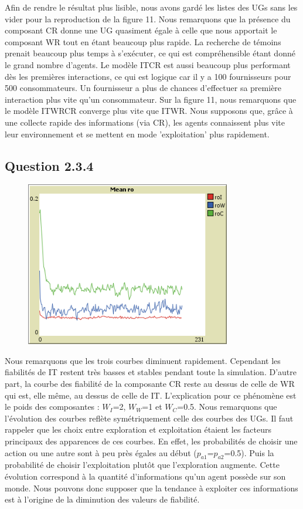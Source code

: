 Afin de rendre le résultat plus lisible, nous avons gardé les listes des UGs sans les vider pour la reproduction de la figure 11.
Nous remarquons que la présence du composant CR donne une UG quasiment égale à celle que nous apportait le composant WR tout en étant beaucoup plus rapide. La recherche de témoins prenait beaucoup plus temps à s'exécuter, ce qui est compréhensible étant donné le grand nombre d'agents. Le modèle ITCR est aussi beaucoup plus performant dès les premières interactions, ce qui est logique car il y a 100 fournisseurs pour 500 consommateurs. Un fournisseur a plus de chances d'effectuer sa première interaction plus vite qu'un consommateur.
Sur la figure 11, nous remarquons que le modèle ITWRCR converge plus vite que ITWR. Nous supposons que, grâce à une collecte rapide des informations (via CR), les agents connaissent plus vite leur environnement et se mettent en mode 'exploitation' plus rapidement.

\subsection{Question 2.3.4}
\begin{figure}[H]
\centering
\captionsetup{justification=centering}
\includegraphics[width=0.8\textwidth]{images/ROs.png}
\label{fig:ROs}
\end{figure}
Nous remarquons que les trois courbes diminuent rapidement. Cependant les fiabilités de IT restent très basses et stables pendant toute la simulation.
D'autre part, la courbe des fiabilité de la composante CR reste au dessus de celle de WR qui est, elle même, au dessus de celle de IT. L'explication pour ce phénomène est le poids des composantes : $W_I$=2, $W_W$=1 et $W_C$=0.5.
Nous remarquons que l'évolution des courbes reflète symétriquement celle des courbes des UGs. Il faut rappeler que les choix entre exploration et exploitation étaient les facteurs principaux des apparences de ces courbes. En effet, les probabilités de choisir une action ou une autre sont à peu près égales au début ($p_{a1}$=$p_{a2}$=0.5). Puis la probabilité de choisir l'exploitation plutôt que l'exploration augmente. Cette évolution correspond à la quantité d'informations qu'un agent possède sur son monde. Nous pouvons donc supposer que la tendance à exploiter ces informations est à l'origine de la diminution des valeurs de fiabilité.